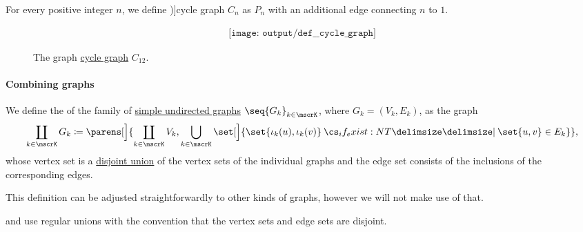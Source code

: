 \begin{definition}\label{def:cycle_graph}
  For every positive integer \( n \), we define \term[en=cycle graph (\cite[532]{Rosen1999})]{cycle graph} \( C_n \) as \hyperref[def:path_graph]{\( P_n \)} with an additional edge connecting \( n \) to \( 1 \).

  \begin{figure}[!ht]
    \begin{equation}\label{eq:fig:def:cycle_graph/c12}
      \begin{aligned}
        \texttt{[image: output/def\_\_cycle\_graph]}
      \end{aligned}
    \end{equation}
    \caption{The graph \hyperref[def:cycle_graph]{cycle graph} \( C_{12} \).}\label{fig:def:cycle_graph/c12}
  \end{figure}
\end{definition}

\paragraph{Combining graphs}

\begin{definition}\label{def:graph_disjoint_union}\mimprovised
  We define the  of the family of \hyperref[def:undirected_graph]{simple undirected graphs} \( \seq{ G_k }_{k \in \mscrK} \), where \( G_k = (V_k, E_k) \), as the graph
  \begin{equation*}
    \coprod_{k \in \mscrK} G_k \coloneqq \parens[\Big]{ \coprod_{k \in \mscrK} V_k, \bigcup_{k \in \mscrK} \set[\Big]{ \set{ \iota_k(u), \iota_k(v) } \given* \set{ u, v } \in E_k } },
  \end{equation*}
  whose vertex set is a \hyperref[def:disjoint_union]{disjoint union} of the vertex sets of the individual graphs and the edge set consists of the inclusions of the corresponding edges.
\end{definition}
\begin{comments}
  \item This definition can be adjusted straightforwardly to other kinds of graphs, however we will not make use of that.
  \item {} and  use regular unions with the convention that the vertex sets and edge sets are disjoint.
\end{comments}

